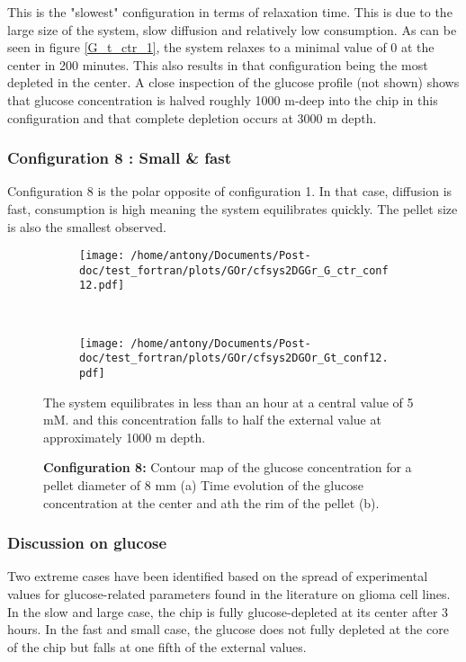 \documentclass[11pt,a4paper]{article}
\begin{document}
This is the "slowest" configuration in terms of relaxation time. This is due to the large size of the system, slow diffusion and relatively low consumption. As can be seen in figure \ref{G_t_ctr_1}, the system relaxes to a minimal value of 0 at the center in 200 minutes. This also results in that configuration being the most depleted in the center. A close inspection of the glucose profile (not shown) shows that glucose concentration is halved roughly 1000 \textmu m-deep into the chip in this configuration and that complete depletion occurs at 3000 \textmu m depth.

\newpage
\subsubsection{Configuration 8 : Small \& fast}
Configuration 8 is the polar opposite of configuration 1. In that case, diffusion is fast, consumption is high meaning the system equilibrates quickly. The pellet size is also the smallest observed.

\begin{figure}[ht!]
	\begin{subfigure}{0.45\textwidth}
	\centering
	\texttt{[image: /home/antony/Documents/Post-doc/test\_fortran/plots/GOr/cfsys2DGGr\_G\_ctr\_conf12.pdf]}
	\caption{ \label{G_ctr_conf12}}
	\end{subfigure}
	~~
	\begin{subfigure}{0.45\textwidth}
	\texttt{[image: /home/antony/Documents/Post-doc/test\_fortran/plots/GOr/cfsys2DGOr\_Gt\_conf12.pdf]}
		\caption{ \label{Gt_conf12}}
	\end{subfigure}
	\caption{\textbf{Configuration 8:} Contour map of the glucose concentration for a pellet diameter of 8 mm (a) Time evolution of the glucose concentration at the center and ath the rim of the pellet (b). \label{G_t_ctr_8}}
	
The system equilibrates in less than an hour at a central value of 5 mM. and this concentration falls to half the external value at approximately 1000 \textmu m depth.
\end{figure}

\subsubsection{Discussion on glucose}
Two extreme cases have been identified based on the spread of experimental values for glucose-related parameters found in the literature on glioma cell lines. In the slow and large case, the chip is fully glucose-depleted at its center after 3 hours. In the fast and small case, the glucose does not fully depleted at the core of the chip but falls at one fifth of the external values.
\end{document}
